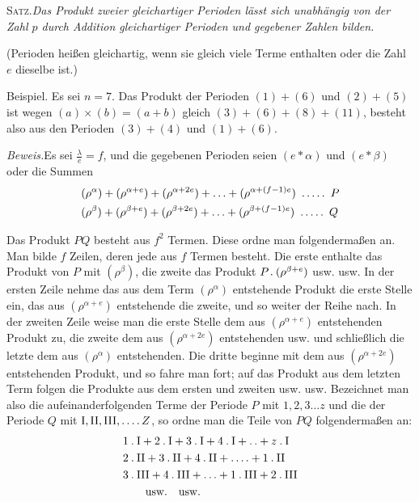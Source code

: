 \textsc{Satz.}\quad\emph{Das Produkt zweier gleichartiger Perioden lässt sich unabhängig von der Zahl $p$ durch Addition gleichartiger Perioden und gegebener Zahlen bilden.}

(Perioden heißen gleichartig, wenn sie gleich viele Terme enthalten oder die Zahl $e$ dieselbe ist.)

Beispiel. Es sei $n=7$. Das Produkt der Perioden $(1)+(6)$ und $(2)+(5)$ ist wegen $(a)\times(b)=(a+b)$ gleich $(3)+(6)+(8)+(11)$, besteht also aus den Perioden $(3)+(4)$ und $(1)+(6)$.

\emph{Beweis.}\quad Es sei $\frac{\lambda}{e}=f$, und die gegebenen Perioden seien $(e\ast\alpha)$ und $(e\ast\beta)$ oder die Summen
\[
\begin{aligned}
&(\rho^\alpha)+(\rho^{\alpha+e})+(\rho^{\alpha+2e})+\ldots+(\rho^{\alpha+(f-1)e})\ \dotsfive\ P\\
&(\rho^\beta)+(\rho^{\beta+e})+(\rho^{\beta+2e})+\ldots+(\rho^{\beta+(f-1)e})\ \dotsfive\ Q
\end{aligned}
\]

Das Produkt $PQ$ besteht aus $f^2$ Termen. Diese ordne man folgendermaßen an. Man bilde $f$ Zeilen, deren jede aus $f$ Termen besteht. Die erste enthalte das Produkt von $P$ mit $(\rho^\beta)$, die zweite das Produkt $P\mathbin{.}(\rho^{\beta+e})$ usw. usw. In der ersten Zeile nehme das aus dem Term $(\rho^\alpha)$ entstehende Produkt die erste Stelle ein, das aus $(\rho^{\alpha+e})$ entstehende die zweite, und so weiter der Reihe nach. In der zweiten Zeile weise man die erste Stelle dem aus $(\rho^{\alpha+e})$ entstehenden Produkt zu, die zweite dem aus $(\rho^{\alpha+2e})$ entstehenden usw. und schließlich die letzte dem aus $(\rho^\alpha)$ entstehenden. Die dritte beginne mit dem aus $(\rho^{\alpha+2e})$ entstehenden Produkt, und so fahre man fort; auf das Produkt aus dem letzten Term folgen die Produkte aus dem ersten und zweiten usw. usw. Bezeichnet man also die aufeinanderfolgenden Terme der Periode $P$ mit $1,2,3\ldots z$ und die der Periode $Q$ mit $\mathrm{I},\mathrm{II},\mathrm{III},\mathinner{.\,.\,.\,.} Z$, so ordne man die Teile von $PQ$ folgendermaßen an:
\[
\begin{aligned}
&1\mathbin{.}\mathrm{I}+2\mathbin{.}\mathrm{I}+3\mathbin{.}\mathrm{I}+4\mathbin{.}\mathrm{I}+\mathinner{.\,.}+z\mathbin{.}\mathrm{I}\\
&2\mathbin{.}\mathrm{II}+3\mathbin{.}\mathrm{II}+4\mathbin{.}\mathrm{II}+\mathinner{.\,.\,.\,.}+1\mathbin{.}\mathrm{II}\\
&3\mathbin{.}\mathrm{III}+4\mathbin{.}\mathrm{III}+\ldots+1\mathbin{.}\mathrm{III}+2\mathbin{.}\mathrm{III}\\
&\qquad\text{usw.}\quad\text{usw.}
\end{aligned}
\]

